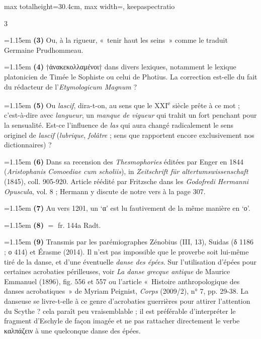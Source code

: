 \documentclass[11pt,twoside]{book}
\newcommand{\italique}[1]{\textit{#1}}
\newcommand{\nieme}[1]{#1\textsuperscript{e}}
\newcommand{\latin}[1]{\textit{#1}}
\begin{document}
\begin{adjustbox}{max totalheight=30.4cm, max width=\textwidth, keepaspectratio}
\begin{minipage}{\textwidth}
{\begin{multicols}{3}
\par\vspace{1.5pt}
\noindent\hangindent=1.15em {\color{sepiaNote}\textbf{(3)}} Ou, à la rigueur, «~tenir haut les seins~» comme le traduit Germaine Prudhommeau.
\par\vspace{1.5pt}
\noindent\hangindent=1.15em {\color{sepiaNote}\textbf{(4)}} †ἀνακεκολλαμένοι† dans divers lexiques, notamment le lexique platonicien de Timée le Sophiste ou celui de Photius. La correction est-elle du fait du rédacteur de l'\latin{Etymologicum Magnum} ?
\par\vspace{1.5pt}
\noindent\hangindent=1.15em {\color{sepiaNote}\textbf{(5)}} Ou \italique{lascif}, dira-t-on, au sens que le \nieme{XXI} siècle prête à ce mot ; c'est-à-dire avec \italique{langueur}, un \italique{manque de vigueur} qui trahit un fort penchant pour la sensualité. Est-ce l'influence de \italique{las} qui aura changé radicalement le sens originel de \italique{lascif} (\italique{lubrique}, \italique{folâtre} ; sens que rapportent encore exclusivement nos dictionnaires) ?
\par\vspace{1.5pt}
\noindent\hangindent=1.15em {\color{sepiaNote}\textbf{(6)}} Dans sa recension des \italique{Thesmophories} éditées par Enger en 1844 (\italique{Aristophanis Comoediae cum scholiis}), in \italique{Zeitschrift für altertumswissenschaft} (1845), coll. 905-920. Article réédité par Fritzsche dans les \italique{Godofredi Hermanni Opuscula}, vol. 8 ; Hermann y discute de notre vers à la page 307.
\par\vspace{1.5pt}
\noindent\hangindent=1.15em {\color{sepiaNote}\textbf{(7)}} Au vers 1201, un `α' est lu fautivement de la même manière en `ο'.
\par\vspace{1.5pt}
\noindent\hangindent=1.15em {\color{sepiaNote}\textbf{(8)}} $=$ fr. 144a Radt.
\par\vspace{1.5pt}
\noindent\hangindent=1.15em {\color{sepiaNote}\textbf{(9)}} Transmis par les parémiographes Zénobius (III, 13), Suidas (δ 1186 ; ο 414) et Érasme (2014). Il n'est pas impossible que le proverbe soit lui-même tiré de la danse, et d'une éventuelle \italique{danse des épées}. Sur l'utilisation d'épées pour certaines acrobaties périlleuses, voir \italique{La danse grecque antique} de Maurice Emmanuel (1896), fig. 556 et 557 ou l'article «~Histoire anthropologique des danses acrobatiques~» de	Myriam Peignist, \italique{Corps} (2009/2), n° 7, pp. 29-38. La danseuse se livre-t-elle à ce genre d'acrobaties guerrières pour attirer l'attention du Scythe ? cela paraît peu vraisemblable ; il est préférable d'interpréter le fragment d'Eschyle de façon imagée et ne pas rattacher directement le verbe καλπάζειν à une quelconque danse des épées.

\end{multicols}}
\end{minipage}
\end{adjustbox}
\end{document}
